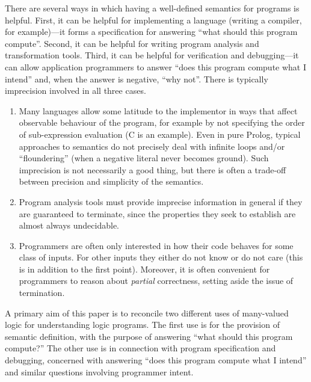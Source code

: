\documentclass{tlp}
\begin{document}
There are several ways in which having a well-defined semantics for
programs is helpful.  First, it can be helpful for implementing a
language (writing a compiler, for example)---it forms a specification
for answering ``what should this program compute''.  Second, it can be
helpful for writing program analysis and transformation tools.  Third, it
can be helpful for verification and debugging---it can allow application
programmers to answer ``does this program compute what I intend'' and,
when the answer is negative, ``why not''.  There is typically imprecision
involved in all three cases.
\begin{enumerate}
\item 
Many languages allow some latitude to the implementor in ways
that affect observable behaviour of the program, for example by not
specifying the order of sub-expression evaluation (C is an example).
Even in pure Prolog, typical
approaches to semantics do not precisely deal with infinite loops
and/or ``floundering'' (when a negative literal never becomes ground).
Such imprecision is not necessarily a good thing, but there is often a
trade-off between precision and simplicity of the semantics.  
\item 
Program analysis tools must provide imprecise information in general if
they are guaranteed to terminate, since the properties they seek to
establish are almost always undecidable.  
\item
Programmers are often only interested
in how their code behaves for some class of inputs. For other inputs
they either do not know or do not care 
(this is in addition to the first point).  
Moreover, it is often convenient for programmers to reason about 
\emph{partial} correctness, setting aside the issue of termination.
\end{enumerate}
A primary aim of this paper is to reconcile two different uses of
many-valued logic for understanding logic programs.
The first use is for the provision of semantic definition,
with the purpose of answering ``what should this program compute?''
The other use is in connection with program specification and
debugging, concerned with answering ``does this program compute what
I intend'' and similar questions involving programmer intent.
\end{document}
